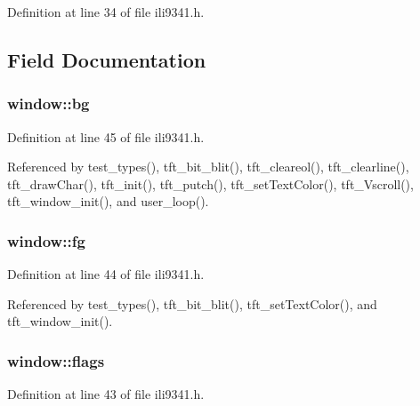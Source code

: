 Definition at line 34 of file ili9341.\+h.



\subsection{Field Documentation}
\subsubsection[{\texorpdfstring{bg}{bg}}]{ window\+::bg}\hypertarget{structwindow_affcf5d29153103c2537542f5a4f8ba87}{}\label{structwindow_affcf5d29153103c2537542f5a4f8ba87}


Definition at line 45 of file ili9341.\+h.



Referenced by test\+\_\+types(), tft\+\_\+bit\+\_\+blit(), tft\+\_\+cleareol(), tft\+\_\+clearline(), tft\+\_\+draw\+Char(), tft\+\_\+init(), tft\+\_\+putch(), tft\+\_\+set\+Text\+Color(), tft\+\_\+\+Vscroll(), tft\+\_\+window\+\_\+init(), and user\+\_\+loop().

\subsubsection[{\texorpdfstring{fg}{fg}}]{ window\+::fg}\hypertarget{structwindow_ac8739cdb3c50efcc1deaa5ab955a5e62}{}\label{structwindow_ac8739cdb3c50efcc1deaa5ab955a5e62}


Definition at line 44 of file ili9341.\+h.



Referenced by test\+\_\+types(), tft\+\_\+bit\+\_\+blit(), tft\+\_\+set\+Text\+Color(), and tft\+\_\+window\+\_\+init().

\subsubsection[{\texorpdfstring{flags}{flags}}]{ window\+::flags}\hypertarget{structwindow_ad58fae853f87093ef4f0139df0a3f33d}{}\label{structwindow_ad58fae853f87093ef4f0139df0a3f33d}


Definition at line 43 of file ili9341.\+h.



